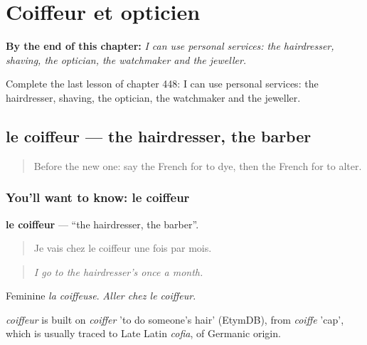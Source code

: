 
\chapter{Coiffeur et opticien}
\label{ch:fr-coiffeur-et-opticien}

\begin{chapteropening}
\textbf{By the end of this chapter:} \emph{I can use personal services: the hairdresser, shaving, the optician, the watchmaker and the jeweller.}

Complete the last lesson of chapter 448: I can use personal services: the hairdresser, shaving, the optician, the watchmaker and the jeweller.
\end{chapteropening}

\section[le coiffeur]{le coiffeur — the hairdresser, the barber}

\label{lesson:FR-C448-coiffeur}



\begin{quote}
Before the new one: say the French for to dye, then the French for to alter.
\end{quote}

\subsection*{You'll want to know: le coiffeur}
\textbf{le coiffeur} — \textquotedblleft{}the hairdresser, the barber\textquotedblright{}.

\begin{quote}
Je vais chez le coiffeur une fois par mois.
\end{quote}

\begin{quote}
\emph{I go to the hairdresser's once a month.}
\end{quote}

Feminine \emph{la coiffeuse}. \emph{Aller chez le coiffeur}.

\begin{cousinweb}
\emph{coiffeur} is built on \emph{coiffer} 'to do someone's hair' (EtymDB), from \emph{coiffe} 'cap', which is usually traced to Late Latin \emph{cofia}, of Germanic origin.
\end{cousinweb}

